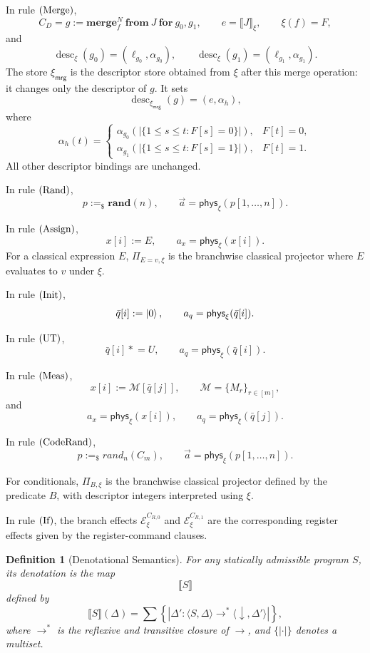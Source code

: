 \documentclass[acmsmall,screen,review,anonymous,nonacm]{acmart}
\newtheorem{definition}{Definition}[section]
\theoremstyle{defn_style}
\newcommand{\sem}[1]{\llbracket #1 \rrbracket}
\newcommand{\asteq}{\mathrel{*}=}
\begin{document}
In rule \({\rm (Merge)}\),
\[
C_D=
g:=
\mathbf{merge}_{f}^{N}\ \mathbf{from}\ J\ \mathbf{for}\ g_0,g_1,
\qquad
e=\llbracket J\rrbracket_{\xi},
\qquad
\xi(f)=F,
\]
and
\[
\operatorname{desc}_{\xi}(g_0)=(\ell_{g_0},\alpha_{g_0}),
\qquad
\operatorname{desc}_{\xi}(g_1)=(\ell_{g_1},\alpha_{g_1}).
\]
The store \(\xi_{\mathsf{mrg}}\) is the descriptor store obtained from \(\xi\)
after this merge operation: it changes only the descriptor of \(g\). It sets
\[
\operatorname{desc}_{\xi_{\mathsf{mrg}}}(g)
=
(e,\alpha_h),
\]
where
\[
\alpha_h(t)=
\begin{cases}
\alpha_{g_0}\!\left(|\{1\le s\le t:F[s]=0\}|\right),
&
F[t]=0,
\\[0.6ex]
\alpha_{g_1}\!\left(|\{1\le s\le t:F[s]=1\}|\right),
&
F[t]=1.
\end{cases}
\]
All other descriptor bindings are unchanged.

In rule \({\rm (Rand)}\),
\[
p:=_{\$}\mathbf{rand}(n),
\qquad
\vec a=\mathsf{phys}_{\xi}(p[1,\ldots,n]).
\]

In rule \({\rm (Assign)}\),
\[
x[i]:=E,
\qquad
a_x=\mathsf{phys}_{\xi}(x[i]).
\]
For a classical expression \(E\), \(\Pi_{E=v,\xi}\) is the branchwise
classical projector where \(E\) evaluates to \(v\) under \(\xi\).

In rule \({\rm (Init)}\),
\[
\bar q[i]:=\ket0,
\qquad
a_q=\mathsf{phys}_{\xi}(\bar q[i]).
\]

In rule \({\rm (UT)}\),
\[
\bar q[i]\asteq U,
\qquad
a_q=\mathsf{phys}_{\xi}(\bar q[i]).
\]

In rule \({\rm (Meas)}\),
\[
x[i]:=\mathcal M[\bar q[j]],
\qquad
\mathcal M=\{M_r\}_{r\in[m]},
\]
and
\[
a_x=\mathsf{phys}_{\xi}(x[i]),
\qquad
a_q=\mathsf{phys}_{\xi}(\bar q[j]).
\]

In rule \({\rm (CodeRand)}\),
\[
p:=_{\$}\textit{rand}_{n}(C_m),
\qquad
\vec a=\mathsf{phys}_{\xi}(p[1,\ldots,n]).
\]

For conditionals, \(\Pi_{B,\xi}\) is the branchwise classical projector
defined by the predicate \(B\), with descriptor integers interpreted using
\(\xi\).

In rule \({\rm (If)}\), the branch effects \(\mathcal E^{C_{R,0}}_{\xi}\) and
\(\mathcal E^{C_{R,1}}_{\xi}\) are the corresponding register effects given by
the register-command clauses.

\begin{definition}[Denotational Semantics]
For any statically admissible program \(S\), its denotation is the map
\[
\sem S
\]
defined by
\[
\sem S(\Delta)
=
\sum
\left\{
\left|
\Delta'
:
\langle S,\Delta\rangle
\longrightarrow^{*}
\langle \downarrow,\Delta'\rangle
\right|
\right\},
\]
where \(\longrightarrow^{*}\) is the reflexive and transitive closure of
\(\longrightarrow\), and \(\{|\cdot|\}\) denotes a multiset.
\end{definition}
\end{document}
